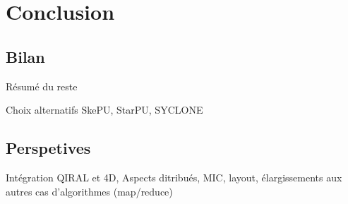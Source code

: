 
\chapter{Conclusion}

\section{Bilan}

Résumé du reste

Choix alternatifs SkePU, StarPU, SYCLONE


\section{Perspetives}

Intégration QIRAL et 4D, Aspects ditribués, MIC, layout, élargissements aux autres cas d'algorithmes (map/reduce)
